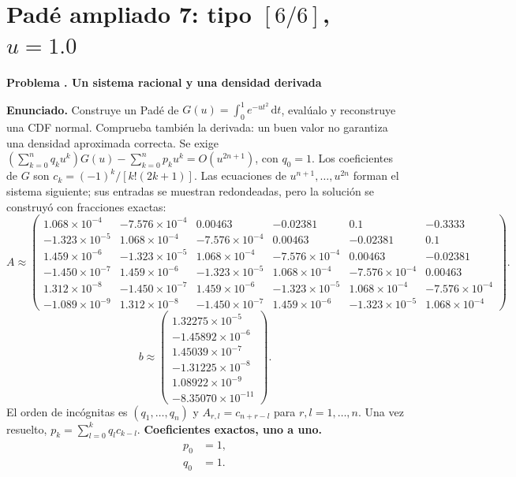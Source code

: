 \documentclass[11pt,a4paper]{article}
\newcommand{\dd}{\,\mathrm d}
\theoremstyle{definition}
\newcounter{problema}
\newenvironment{resuelto}[1]{\refstepcounter{problema}\par\medskip\Needspace{6\baselineskip}\textbf{Problema \theproblema. #1}\par}{\par\medskip}
\begin{document}
\section{\texorpdfstring{Padé ampliado 7: tipo $[6/6]$, $u=1.0$}{Padé ampliado 7: tipo [6/6], u=1.0}}
\begin{resuelto}{Un sistema racional y una densidad derivada}
\textbf{Enunciado.} Construye un Padé de $G(u)=\int_0^1e^{-ut^2}\dd t$, evalúalo y reconstruye una CDF normal. Comprueba también la derivada: un buen valor no garantiza una densidad aproximada correcta.
Se exige $(\sum_{k=0}^{n}q_ku^k)G(u)-\sum_{k=0}^{n}p_ku^k=O(u^{2n+1})$, con $q_0=1$. Los coeficientes de $G$ son $c_k=(-1)^k/[k!(2k+1)]$.
Las ecuaciones de $u^{n+1},\ldots,u^{2n}$ forman el sistema siguiente; sus entradas se muestran redondeadas, pero la solución se construyó con fracciones exactas:
{\small
\[
A\approx\begin{pmatrix}1.068\times10^{-4}&-7.576\times10^{-4}&0.00463&-0.02381&0.1&-0.3333\\-1.323\times10^{-5}&1.068\times10^{-4}&-7.576\times10^{-4}&0.00463&-0.02381&0.1\\1.459\times10^{-6}&-1.323\times10^{-5}&1.068\times10^{-4}&-7.576\times10^{-4}&0.00463&-0.02381\\-1.450\times10^{-7}&1.459\times10^{-6}&-1.323\times10^{-5}&1.068\times10^{-4}&-7.576\times10^{-4}&0.00463\\1.312\times10^{-8}&-1.450\times10^{-7}&1.459\times10^{-6}&-1.323\times10^{-5}&1.068\times10^{-4}&-7.576\times10^{-4}\\-1.089\times10^{-9}&1.312\times10^{-8}&-1.450\times10^{-7}&1.459\times10^{-6}&-1.323\times10^{-5}&1.068\times10^{-4}\end{pmatrix}.
\]
\[
b\approx\begin{pmatrix}1.32275\times10^{-5}\\-1.45892\times10^{-6}\\1.45039\times10^{-7}\\-1.31225\times10^{-8}\\1.08922\times10^{-9}\\-8.35070\times10^{-11}\end{pmatrix}.
\]
}
El orden de incógnitas es $(q_1,\ldots,q_n)$ y $A_{r,l}=c_{n+r-l}$ para $r,l=1,\ldots,n$. Una vez resuelto, $p_k=\sum_{l=0}^{k}q_lc_{k-l}$.
\textbf{Coeficientes exactos, uno a uno.}
\[
\begin{aligned}p_0&=1,\\q_0&=1.\end{aligned}
\]

\end{resuelto}
\end{document}

